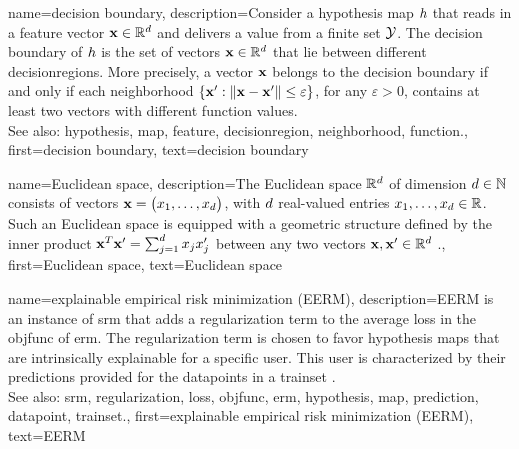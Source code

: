 {name={decision boundary}, 
	description={Consider a 
		\gls{hypothesis} \gls{map} $h$ that reads in a \gls{feature} vector 
		${\bf x} \in \mathbb{R}^{d}$ and delivers a value from a finite set $\mathcal{Y}$. 
		The decision boundary of $h$ is the set of vectors ${\bf x} \in \mathbb{R}^{d}$ 
		that lie between different \glspl{decisionregion}. More precisely, a 
		vector ${\bf x}$ belongs to the decision boundary if and only 
		if each \gls{neighborhood} $\{ {\bf x}': \| {\bf x} - {\bf x}' \| \leq \varepsilon \}$, 
		for any $\varepsilon >0$, contains at least two vectors with different \gls{function} values.
				\\
		See also: \gls{hypothesis}, \gls{map}, \gls{feature}, \gls{decisionregion}, \gls{neighborhood}, \gls{function}.},
	first={decision boundary},
	text={decision boundary} 
}


{name={Euclidean space}, 
	description={The 
		Euclidean space $\mathbb{R}^{d}$ of dimension $d \in \mathbb{N}$ consists 
		of vectors ${\bf x}= \big(x_{1},\ldots,x_{d}\big)$, with $d$ 
		real-valued entries $x_{1},\ldots,x_{d} \in \mathbb{R}$. Such an Euclidean 
		space is equipped with a geometric structure defined by the inner product 
		${\bf x}^{T} {\bf x}' = \sum_{j=1}^{d} x_{j} x'_{j}$ 
		between any two vectors ${\bf x},{\bf x}' \in \mathbb{R}^{d}$ \cite{RudinBookPrinciplesMatheAnalysis}.},
	first={Euclidean space},
	text={Euclidean space} 
}

{name={explainable empirical risk minimization (EERM)}, 
	description={EERM is an 
		instance of \gls{srm} that adds a \gls{regularization} term to the 
		average \gls{loss} in the \gls{objfunc} of \gls{erm}. 
		The \gls{regularization} term is chosen to favor \gls{hypothesis} \glspl{map} that are intrinsically 
		explainable for a specific user. This user is characterized by their \glspl{prediction} provided 
		for the \glspl{datapoint} in a \gls{trainset} \cite{Zhang:2024aa}.
				\\
		See also: \gls{srm}, \gls{regularization}, \gls{loss}, \gls{objfunc}, \gls{erm}, \gls{hypothesis}, \gls{map}, \gls{prediction}, \gls{datapoint}, \gls{trainset}.},
	first={explainable empirical risk minimization (EERM)},
	text={EERM} 
}
	
